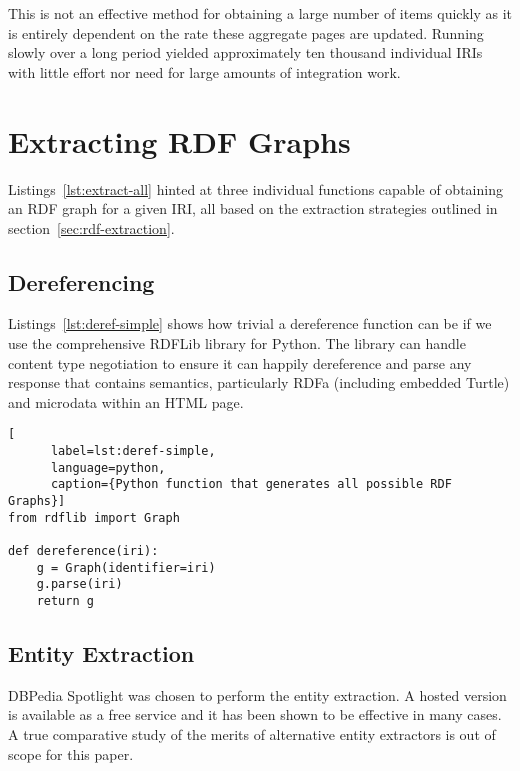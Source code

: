 This is not an effective method for obtaining a large number of items
quickly as it is entirely dependent on the rate these aggregate pages
are updated. Running slowly over a long period yielded approximately
ten thousand individual IRIs with little effort nor need for large
amounts of integration work.

\section{Extracting RDF Graphs}
\label{sec:impl-extraction}

Listings~\ref{lst:extract-all} hinted at three individual functions
capable of obtaining an RDF graph for a given IRI, all based on the
extraction strategies outlined in section~\ref{sec:rdf-extraction}.

\subsection{Dereferencing}

Listings~\ref{lst:deref-simple} shows how trivial a dereference
function can be if we use the comprehensive RDFLib library for
Python. The library can handle content type
negotiation\cite{fielding2014hypertext} to ensure it can happily
dereference and parse any response that contains semantics,
particularly RDFa (including embedded Turtle) and microdata within an
HTML page.

\begin{centering}
  \begin{lstlisting}[
      label=lst:deref-simple,
      language=python,
      caption={Python function that generates all possible RDF Graphs}]
from rdflib import Graph
    
def dereference(iri):
    g = Graph(identifier=iri)
    g.parse(iri)
    return g
  \end{lstlisting}
\end{centering}

\subsection{Entity Extraction}
\label{sec:impl-entity-extraction}

DBPedia Spotlight\cite{isem2013daiber} was chosen to perform the
entity extraction. A hosted version is available as a free service and
it has been shown to be effective in many cases. A true comparative
study of the merits of alternative entity extractors is out of scope
for this paper.

